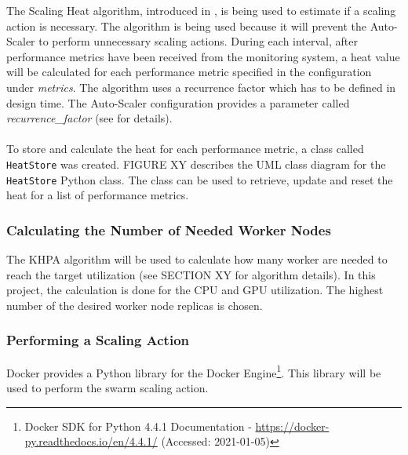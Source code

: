 %
%

The Scaling Heat algorithm, introduced in , is being used to estimate if a scaling action is necessary.
The algorithm is being used because it will prevent the Auto-Scaler to perform unnecessary scaling actions.
During each interval, after performance metrics have been received from the monitoring system, a heat value will be calculated for each performance metric specified in the configuration under \textit{metrics}.
The algorithm uses a recurrence factor which has to be defined in design time. The Auto-Scaler configuration provides a parameter called \textit{recurrence\_factor} (see  for details). 


\paragraph{}To store and calculate the heat for each performance metric, a class called \texttt{HeatStore} was created.
FIGURE XY describes the UML class diagram for the \texttt{HeatStore} Python class.
The class can be used to retrieve, update and reset the heat for a list of performance metrics.


\subsubsection{Calculating the Number of Needed Worker Nodes}

%
%


The KHPA algorithm will be used to calculate how many worker are needed to reach the target utilization (see SECTION XY for algorithm details). 
In this project, the calculation is done for the CPU and GPU utilization. The highest number of the desired worker node replicas is chosen.


\subsubsection{Performing a Scaling Action}

%
%


Docker provides a Python library for the Docker Engine\footnote{Docker SDK for Python 4.4.1 Documentation - \url{https://docker-py.readthedocs.io/en/4.4.1/} (Accessed: 2021-01-05)}. This library will be used to perform the swarm scaling action.



